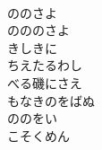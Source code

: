 \documentclass[10pt,b5j]{tarticle} %
\begin{document}
\begin{enumerate}
\begin{minipage}[c]{\blocksize}
    \end{minipage}
    \begin{minipage}[c]{\blocksize}
        
        \vspace{\linespace}
        \item~\\
        ののさよ\\
        のののさよ\\
        きしきに\\
        ちえたるわし\\
        べる磯にさえ\\
        もなきのをばぬ\\
        ののをい\\
        こそくめん
    
    \end{minipage}
\end{enumerate} %
\end{document}
